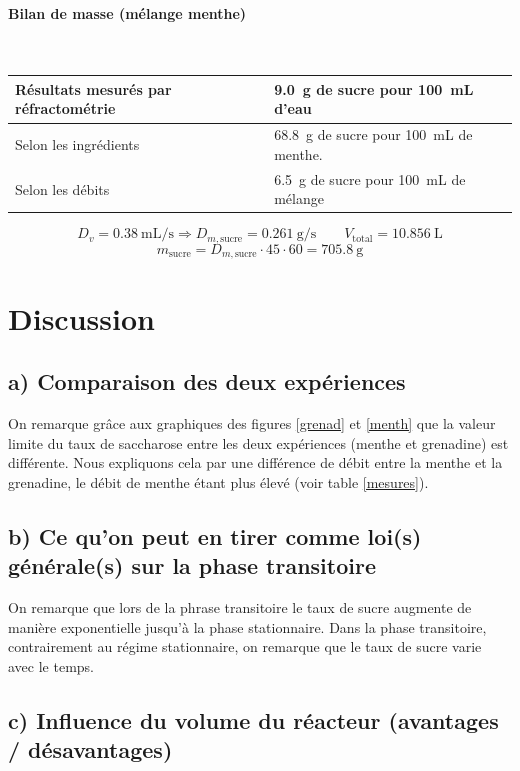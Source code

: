 \documentclass[a4paper,11pt, french]{article}
\begin{document}
	\paragraph*{Bilan de masse (mélange menthe)}\mbox{} \\
		\begin{table}[h]
			\centering
			\begin{tabular}{|l|l|}\hline
				Résultats mesurés par réfractométrie & \SI{9.0}{\gram} de sucre pour \SI{100}{\milli\liter} d'eau\\\hline
				Selon les ingrédients & \SI{68.8}{\gram} de sucre pour \SI{100}{\milli\liter} de menthe.\\\hline
				Selon les débits & \SI{6.5}{\gram} de sucre pour \SI{100}{\milli\liter} de mélange\\\hline
			\end{tabular}
		\end{table}
		$$D_v = \SI{0.38}{\milli\liter\per\second} \Rightarrow D_{m,\text{sucre}} = \SI{0.261}{\gram\per\second} \qquad V_\text{total} = \SI{10.856}{\liter}$$
		$$m_\text{sucre} = D_{m,\text{sucre}} \cdot 45 \cdot 60 = \SI{705.8}{\gram}$$
		
		

\section{Discussion}
	\subsection*{a) Comparaison des deux expériences}
On remarque grâce aux graphiques des figures \ref{grenad} et \ref{menth} que la valeur limite du taux de saccharose entre les deux expériences (menthe et grenadine) est différente. Nous expliquons cela par une différence de débit entre la menthe et la grenadine, le débit de menthe étant plus élevé (voir table \ref{mesures}).

	\subsection*{b) Ce qu'on peut en tirer comme loi(s) générale(s) sur la phase transitoire}
On remarque que lors de la phrase transitoire le taux de sucre augmente de manière exponentielle jusqu'à la phase stationnaire. Dans la phase transitoire, contrairement au régime stationnaire, on remarque que le taux de sucre varie avec le temps.

	\subsection*{c) Influence du volume du réacteur (avantages / désavantages)}
\end{document}
